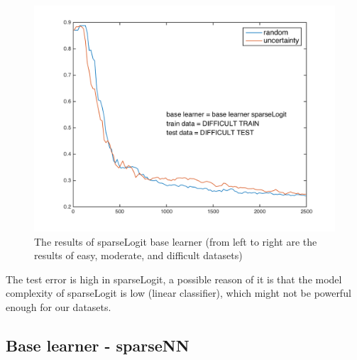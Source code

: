 \documentclass{article}
\begin{document}
\begin{figure}[!ht]
\begin{minipage}{.31\textwidth}
      \includegraphics[width=1\linewidth]{../sparseLogit_difficult}
    \end{minipage}
    \caption{The results of sparseLogit base learner (from left to right are the results of easy, moderate, and difficult datasets)}
    \label{fig:sparseLogit}
  \end{figure}
The test error is high in sparseLogit, a possible reason of it is that the model complexity of sparseLogit is low (linear classifier), which might not be powerful enough for our datasets.

\subsection{Base learner - sparseNN}
\end{document}
